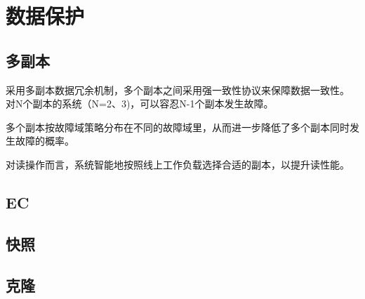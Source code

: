 \chapter{数据保护}

\section{多副本}

采用多副本数据冗余机制，多个副本之间采用强一致性协议来保障数据一致性。
对N个副本的系统（N=2、3)，可以容忍N-1个副本发生故障。

多个副本按故障域策略分布在不同的故障域里，从而进一步降低了多个副本同时发生故障的概率。

对读操作而言，系统智能地按照线上工作负载选择合适的副本，以提升读性能。

\section{EC}

\section{快照}

\section{克隆}
